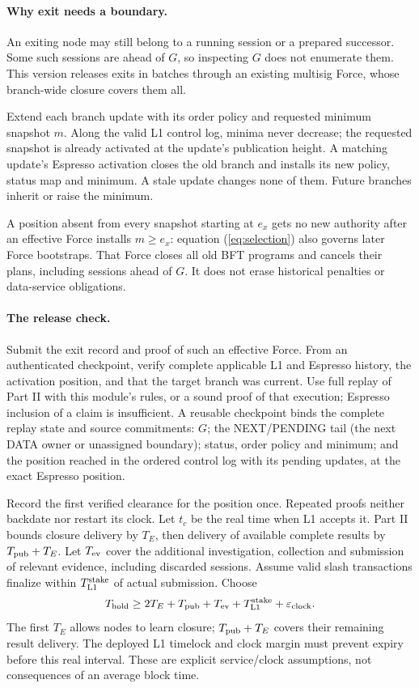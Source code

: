 \documentclass[11pt,a4paper]{article}
\begin{document}
\paragraph{Why exit needs a boundary.}
An exiting node may still belong to a running session or a prepared
successor. Some such sessions are ahead of $G$, so inspecting $G$ does
not enumerate them. This version releases exits in batches through an
existing multisig Force, whose branch-wide closure covers them all.

Extend each branch update with its order policy and requested minimum
snapshot $m$. Along the valid L1 control log, minima never decrease; the
requested snapshot is already activated at the update's publication
height. A matching update's Espresso activation closes the old branch
and installs its new policy, status map and minimum. A stale update
changes none of them. Future branches inherit or raise the minimum.

A position absent from every snapshot starting at $e_x$ gets no new
authority after an effective Force installs $m\ge e_x$: equation
(\ref{eq:selection}) also governs later Force bootstraps. That Force closes
all old BFT programs and cancels their plans, including sessions ahead of
$G$. It does not erase historical penalties or data-service obligations.

\paragraph{The release check.}
Submit the exit record and proof of such an effective Force. From an
authenticated checkpoint, verify complete applicable L1 and Espresso
history, the activation position, and that the target branch was current.
Use full replay of Part II with this module's rules, or a sound proof of
that execution; Espresso inclusion of a claim is insufficient. A reusable
checkpoint binds the complete replay state and source commitments:
$G$; the NEXT/PENDING tail (the next DATA owner or unassigned boundary);
status, order policy and minimum; and the position reached in the ordered
control log with its pending updates, at the exact Espresso position.

Record the first verified clearance for the position once. Repeated
proofs neither backdate nor restart its clock. Let $t_c$ be the real time
when L1 accepts it. Part II bounds closure delivery by $T_E$, then delivery
of available complete results by $T_{\rm pub}+T_E$. Let $T_{\rm ev}$ cover
the additional investigation, collection and submission of relevant
evidence, including discarded sessions. Assume valid slash transactions
finalize within $T_{\rm L1}^{\rm stake}$ of actual submission. Choose
\[
 T_{\rm hold}\ge 2T_E+T_{\rm pub}+T_{\rm ev}
                    +T_{\rm L1}^{\rm stake}+\varepsilon_{\rm clock}.
\]
The first $T_E$ allows nodes to learn closure; $T_{\rm pub}+T_E$ covers
their remaining result delivery. The deployed L1 timelock and clock
margin must prevent expiry before this real interval. These are explicit
service/clock assumptions, not consequences of an average block time.
\end{document}
